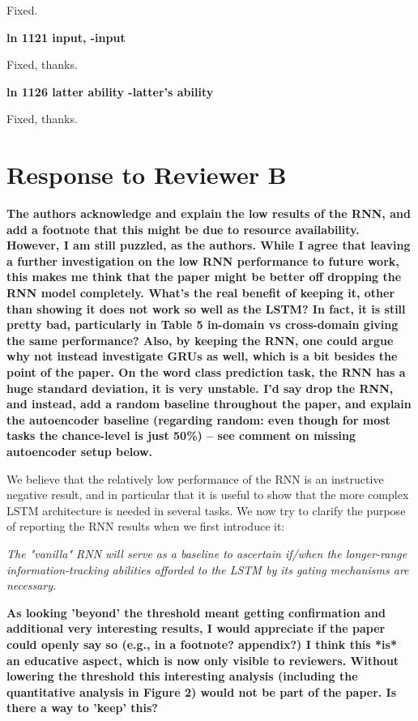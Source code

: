 \documentclass{article}[11pt,a4paper,oneside]
\begin{document}
Fixed.\newline

\textbf{
ln 1121 input, -input}

Fixed, thanks.\newline

\textbf{
ln 1126 latter ability -latter's ability}

Fixed, thanks.

\section{Response to Reviewer B}

\textbf{
The authors acknowledge and explain the low results of the RNN, and add a
footnote that this might be due to resource availability. However, I am
still puzzled, as the authors. While I agree that leaving a further
investigation on the low RNN performance to future work, this makes me think
that the paper might be better off dropping the RNN model completely. What's
the real benefit of keeping it, other than showing it does not work so well
as the LSTM? In fact, it is still pretty bad, particularly in Table 5 in-domain vs
cross-domain giving the same performance? Also, by keeping the RNN, one
could argue why not instead investigate GRUs as well, which is a bit besides
the point of the paper. On the word class prediction task, the RNN has a
huge standard deviation, it is very unstable. I'd say drop the RNN, and
instead, add a random baseline throughout the paper, and explain the
autoencoder baseline (regarding random: even though for most tasks the
chance-level is just 50\%) -- see comment on missing autoencoder setup below.}

We believe that the relatively low performance of the RNN is an instructive negative result, and in particular that it is useful to show that the more complex LSTM architecture is needed in several tasks. We now try to clarify the purpose of reporting the RNN results when we first introduce it:

\textit{The "vanilla" RNN will serve as a baseline  to ascertain if/when the longer-range information-tracking abilities afforded to the LSTM by its gating mechanisms are necessary.}\newline

\textbf{
As looking 'beyond' the threshold meant getting confirmation and additional
very interesting results, I would appreciate if the paper could openly say
so (e.g., in a footnote? appendix?)  I think this *is* an educative aspect,
which is now only visible to reviewers. Without lowering the threshold this
interesting analysis (including the quantitative analysis in Figure 2) would
not be part of the paper. Is there a way to 'keep' this?}
\end{document}
